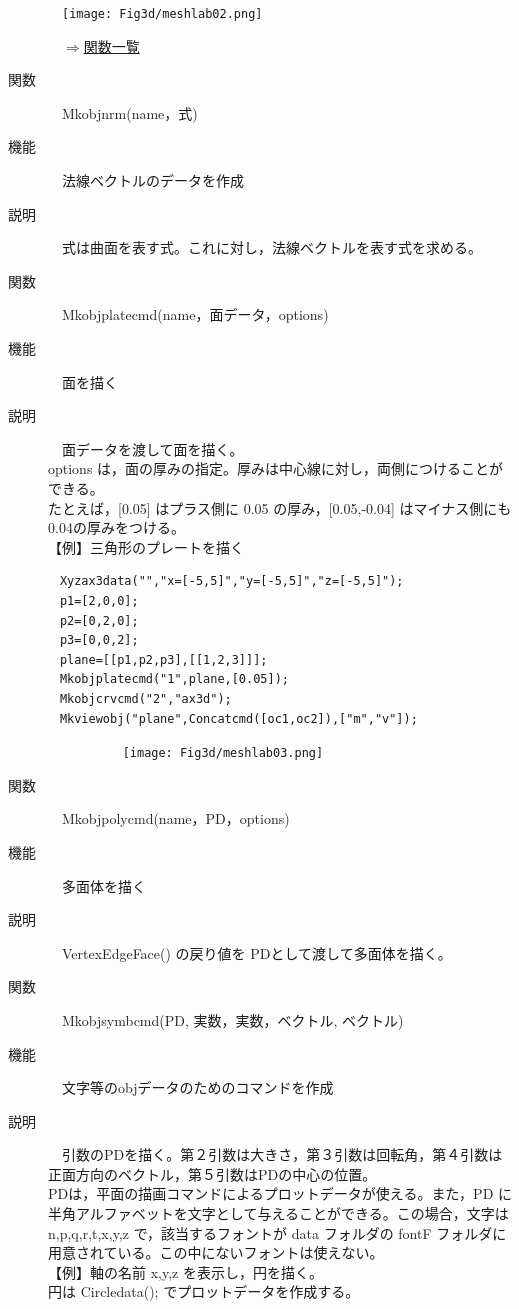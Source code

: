 \documentclass[papersize,a4paper,12pt,uplatex]{jsarticle}
\begin{document}
\begin{description}
　\texttt{[image: Fig3d/meshlab02.png]}\\
\begin{flushright}　\hyperlink{functionlist}{$\Rightarrow$関数一覧}\end{flushright}

\hypertarget{mkobjnrm}{}
\item[関数]　Mkobjnrm(name，式)
\item[機能]　法線ベクトルのデータを作成
\item[説明]　式は曲面を表す式。これに対し，法線ベクトルを表す式を求める。\\

\hypertarget{mkobjplatecmd}{}
\item[関数]　Mkobjplatecmd(name，面データ，options)
\item[機能]　面を描く
\item[説明]　面データを渡して面を描く。\\
options は，面の厚みの指定。厚みは中心線に対し，両側につけることができる。\\
たとえば，[0.05] はプラス側に 0.05 の厚み，[0.05,-0.04] はマイナス側にも0.04の厚みをつける。\\

【例】三角形のプレートを描く
\begin{verbatim}
　Xyzax3data("","x=[-5,5]","y=[-5,5]","z=[-5,5]");
　p1=[2,0,0];
　p2=[0,2,0];
　p3=[0,0,2];
　plane=[[p1,p2,p3],[[1,2,3]]];
　Mkobjplatecmd("1",plane,[0.05]);
　Mkobjcrvcmd("2","ax3d");
　Mkviewobj("plane",Concatcmd([oc1,oc2]),["m","v"]); 
  \end{verbatim}
　　　　  　\texttt{[image: Fig3d/meshlab03.png]}\\


\hypertarget{mkobjpolycmd}{}
\item[関数]　Mkobjpolycmd(name，PD，options)
\item[機能]　多面体を描く
\item[説明]　VertexEdgeFace() の戻り値を PDとして渡して多面体を描く。\\


 
\hypertarget{mkobjsymbcmd}{}
\item[関数]　Mkobjsymbcmd(PD, 実数，実数，ベクトル, ベクトル)
\item[機能]　文字等のobjデータのためのコマンドを作成
\item[説明]　引数のPDを描く。第２引数は大きさ，第３引数は回転角，第４引数は正面方向のベクトル，第５引数はPDの中心の位置。\\
PDは，平面の描画コマンドによるプロットデータが使える。また，PD に半角アルファベットを文字として与えることができる。この場合，文字は n,p,q,r,t,x,y,z で，該当するフォントが data フォルダの fontF フォルダに用意されている。この中にないフォントは使えない。　\\
【例】軸の名前 x,y,z を表示し，円を描く。\\
円は Circledata(); でプロットデータを作成する。\\
\begin{verbatim}
\end{verbatim}



\end{description}
\end{document}
